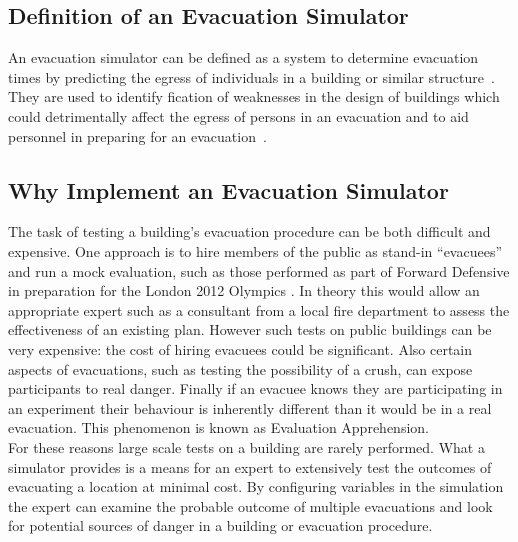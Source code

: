 \documentclass[a4paper,10pt]{article}
\begin{document}
\subsection{Definition of an Evacuation Simulator}
An evacuation simulator can be defined as a system to determine evacuation
times by predicting the egress of individuals in a building or similar
structure~\cite{evacuationSimulatordefinition}. They are used to identify
fication of weaknesses in the design of buildings which could detrimentally affect
the egress of persons in an evacuation and to aid personnel in
preparing for an evacuation~\cite{evacuationModel}.

\subsection{Why Implement an Evacuation Simulator}
The task of testing a building's evacuation procedure can be
both difficult and expensive. One approach is to hire members of the public
as stand-in ``evacuees'' and run a mock evaluation, such as those performed as part of Forward Defensive
in preparation for the London 2012 Olympics \cite{DailyMailEvacuation}. In theory this would allow an 
appropriate expert such as a consultant from a local fire department to assess the effectiveness
of an existing plan. However such tests on public buildings can be very expensive: the cost
of hiring evacuees could be significant. Also certain aspects of evacuations, such
as testing the possibility of a crush, can expose participants
to real danger. Finally if an evacuee knows they are participating in an experiment
their behaviour is inherently different than it would be in a real evacuation. This
phenomenon is known as Evaluation Apprehension\cite{EvalApprehension}.\\
For these reasons large scale tests on a building are rarely performed.
What a simulator provides is a means for an expert to extensively test the outcomes of evacuating a location
at minimal cost. By configuring variables in the simulation the expert can examine the probable outcome of multiple evacuations
and look for potential sources of danger in a building or evacuation procedure.
\end{document}
